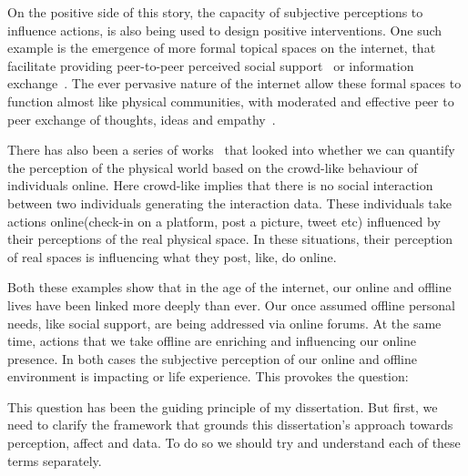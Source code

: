 On the positive side of this story, the capacity of subjective perceptions to influence actions, is also being used to design positive interventions. One such example is the emergence of more formal topical spaces on the internet, that facilitate providing peer-to-peer perceived social support~\cite{coulson2005receiving,balasooriya2016barriers} or information exchange~\cite{frost2008social}. The ever pervasive nature of the internet allow these formal spaces to function almost like physical communities, with moderated and effective peer to peer exchange of thoughts, ideas and empathy~\cite{kummervold2002social,squire2015should,hwang2010social}.

There has also been a series of works~\cite{jang2019crowd,quercia2014aesthetic,quercia2015smelly,quercia2015chatty,quercia2014shortest} that looked into whether we can quantify the perception of the physical world based on the crowd-like behaviour of individuals online. Here crowd-like implies that there is no social interaction between two individuals generating the interaction data. These individuals take actions online(check-in on a platform, post a picture, tweet etc) influenced by their perceptions of the real physical space. In these situations, their perception of real spaces is influencing what they post, like, do online.
 
Both these examples show that in the age of the internet, our online and offline lives have been linked more deeply than ever. Our once assumed offline personal needs, like social support,  are being addressed via online forums. At the same time, actions that we take offline are enriching and influencing our online presence. In both cases the subjective perception of our online and offline environment is impacting or life experience. This provokes the question:

\noindent{}

\vspace{1cm}
This question has been the guiding principle of my dissertation. 
But first, we need to clarify the framework that grounds this dissertation's approach towards perception, affect and data. To do so we should try and understand each of these terms separately. 



